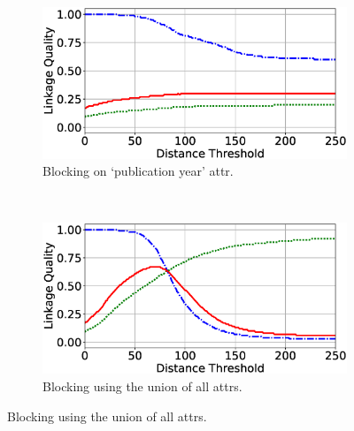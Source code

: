 \documentclass{llncs}
\begin{document}
\begin{figure}
\begin{subfigure}{.47\textwidth}
  \centering
\includegraphics[width=\textwidth]{figures/plotLQ-cora-trad-year}
\caption{Blocking on `publication year' attr.}
\end{subfigure}%
~~
\begin{subfigure}{.47\textwidth}
  \centering
\includegraphics[width=\textwidth]{figures/plotLQ-cora-trad-combined}
\caption{Blocking using the union of all attrs.}
\end{subfigure} %


\end{figure}
\end{document}
